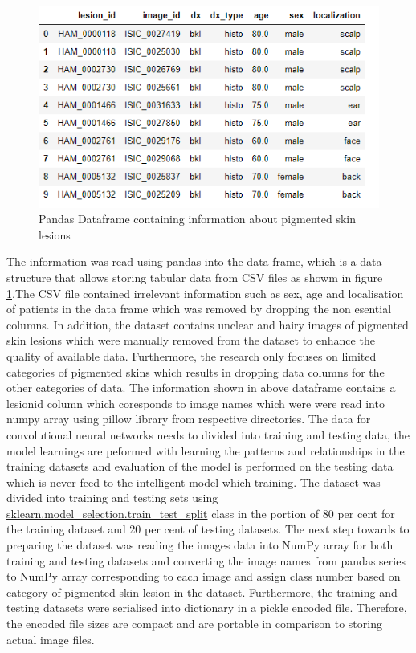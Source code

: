 \begin{figure} [htp]
    \includegraphics[width=\textwidth]{Images/datae.png}
    \caption{Pandas Dataframe containing information about pigmented skin lesions}
    \label{fig:pandasTop}
\end{figure}

The information was read using pandas into the data frame, 
which is a data structure that allows storing tabular data from CSV files as showm in 
figure \ref{fig:pandasTop}.The CSV file contained irrelevant information such as sex, age and localisation 
of patients in the data frame which was removed by dropping the non esential columns.
In addition, the dataset contains unclear and hairy images of pigmented skin lesions which were manually 
removed from the dataset to enhance the quality of available data.
Furthermore, the research only focuses on limited categories of 
pigmented skins which results in dropping data columns for the other categories 
of data. The information shown in above dataframe contains a lesionid column which coresponds
to image names which were were read into numpy array using pillow library from respective directories.
The data for convolutional neural networks needs to divided into training and testing data, the model learnings
are peformed with learning the patterns and relationships in the training datasets and evaluation of the 
model is performed on the testing data which is never feed to the intelligent model which training.
The dataset was divided into training and testing sets using \url{sklearn.model_selection.train_test_split} class in the portion of 80 per cent for 
the training dataset and 20 per cent of testing datasets. The next step towards to preparing the dataset was reading the images data into NumPy 
array for both training and testing datasets and converting the image names from pandas series to NumPy array corresponding to each image and assign class number 
based on category of pigmented skin lesion in the dataset. Furthermore, the training and testing datasets were serialised into 
dictionary in a pickle encoded file. Therefore, the encoded file sizes are compact and are portable
in comparison to storing actual image files.